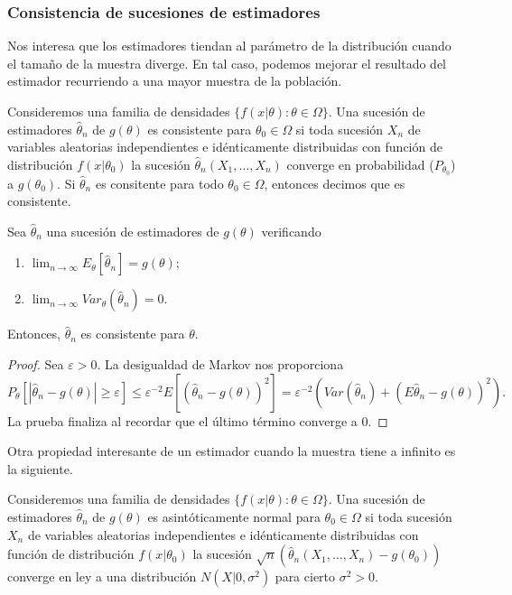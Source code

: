 \documentclass{article}
\begin{document}
    \subsubsection{Consistencia de sucesiones de estimadores}

    Nos interesa que los estimadores tiendan al parámetro de la distribución cuando el tamaño de la muestra diverge. En tal caso, podemos mejorar el resultado del estimador recurriendo a una mayor muestra de la población.

    \begin{definition}
        Consideremos una familia de densidades $\{f(x | \theta) : \theta \in \Omega\}$. Una sucesión de estimadores $\hat\theta_n$ de $g(\theta)$ es consistente para $\theta_0 \in \Omega$ si toda sucesión $X_n$ de variables aleatorias independientes e idénticamente distribuidas con función de distribución $f(x | \theta_0)$ la sucesión $\hat\theta_n(X_1, \ldots, X_n)$ converge en probabilidad ($P_{\theta_0}$) a $g(\theta_0)$. Si $\hat\theta_n$ es consitente para todo $\theta_0 \in \Omega$, entonces decimos que es consistente.
    \end{definition}

    \begin{thm}
        Sea $\hat\theta_n$ una sucesión de estimadores de $g(\theta)$ verificando
        \begin{enumerate}
            \item $\lim_{n \to \infty} E_\theta[\hat\theta_n] = g(\theta)$;
            \item $\lim_{n \to \infty} Var_\theta(\hat\theta_n) = 0$.
        \end{enumerate}
        Entonces, $\hat\theta_n$ es consistente para $\theta$.
    \end{thm}
    \begin{proof}
        Sea $\varepsilon > 0$. La desigualdad de Markov nos proporciona
        \[P_\theta[|\hat\theta_n - g(\theta)| \ge \varepsilon] \le \varepsilon^{-2} E[(\hat\theta_n - g(\theta))^2] = \varepsilon^{-2}  \left(Var(\hat\theta_n) + (E\hat\theta_n -g(\theta))^2\right).\]
        La prueba finaliza al recordar que el último término converge a $0$.
    \end{proof}

    Otra propiedad interesante de un estimador cuando la muestra tiene a infinito es la siguiente.

    \begin{definition}
        Consideremos una familia de densidades $\{f(x | \theta) : \theta \in \Omega\}$. Una sucesión de estimadores $\hat\theta_n$ de $g(\theta)$ es asintóticamente normal para $\theta_0 \in \Omega$ si toda sucesión $X_n$ de variables aleatorias independientes e idénticamente distribuidas con función de distribución $f(x | \theta_0)$ la sucesión $\sqrt{n}(\hat\theta_n(X_1, \ldots, X_n) - g(\theta_0))$ converge en ley a una distribución $N(X|0,\sigma^2)$ para cierto $\sigma^2 > 0$.
    \end{definition}
\end{document}
